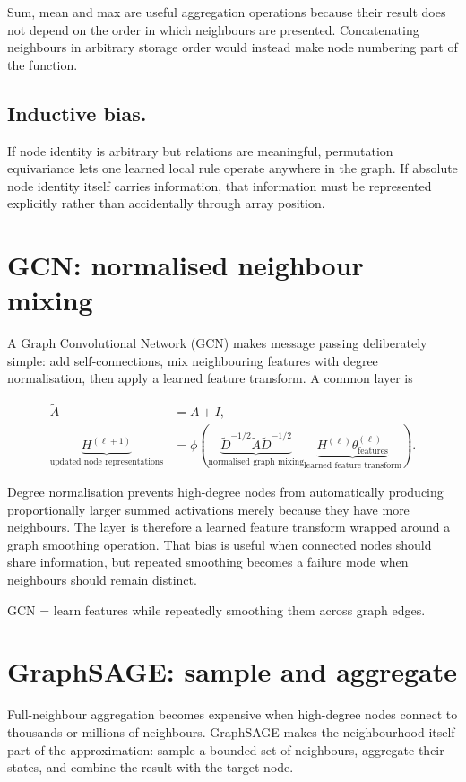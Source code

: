 Sum, mean and max are useful aggregation operations because their result does not depend on the order in which neighbours are presented.
Concatenating neighbours in arbitrary storage order would instead make node numbering part of the function.

\subsection{Inductive bias.}
If node identity is arbitrary but relations are meaningful, permutation equivariance lets one learned local rule operate anywhere in the graph.
If absolute node identity itself carries information, that information must be represented explicitly rather than accidentally through array position.

\section{GCN: normalised neighbour mixing}
A Graph Convolutional Network (GCN) makes message passing deliberately simple: add self-connections, mix neighbouring features with degree normalisation, then apply a learned feature transform.
A common layer is

\[
\begin{aligned}
\widetilde A&=A+I,\\
\underbrace{H^{(\ell+1)}}_{\text{updated node representations}}
&=
\phi\!\left(
\underbrace{\widetilde D^{-1/2}\widetilde A\widetilde D^{-1/2}}_{\text{normalised graph mixing}}
\underbrace{H^{(\ell)}\theta_{\text{features}}^{(\ell)}}_{\text{learned feature transform}}
\right).
\end{aligned}
\]

Degree normalisation prevents high-degree nodes from automatically producing proportionally larger summed activations merely because they have more neighbours.
The layer is therefore a learned feature transform wrapped around a graph smoothing operation.
That bias is useful when connected nodes should share information, but repeated smoothing becomes a failure mode when neighbours should remain distinct.

\begin{calloutintuition}
GCN = learn features while repeatedly smoothing them across graph edges.
\end{calloutintuition}

\section{GraphSAGE: sample and aggregate}
Full-neighbour aggregation becomes expensive when high-degree nodes connect to thousands or millions of neighbours.
GraphSAGE makes the neighbourhood itself part of the approximation: sample a bounded set of neighbours, aggregate their states, and combine the result with the target node.

